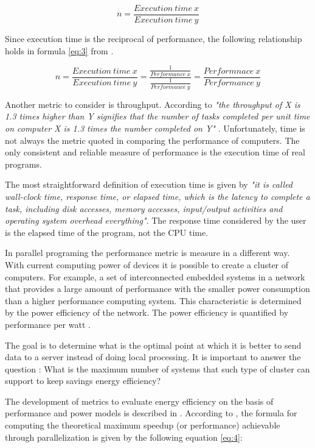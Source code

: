 \begin{equation}\label{eq:2}
n = \frac{Execution\ time\ x}{Execution\ time\ y}
\end{equation}

Since execution time is the reciprocal of performance, the following
relationship holds in formula \ref{eq:3} from \cite{Hennessy}.

\begin{equation}\label{eq:3}
n = \frac{Execution\ time\ x}{Execution\ time\ y} = \frac{\frac{1}{Performance\
x}}{\frac{1}{Performance\ y}} = \frac{Performnace\ x}{Performance\ y}
\end{equation}

Another metric to consider is throughput. According to \cite{Hennessy}
\textit{"the throughput of X is 1.3 times higher than Y signifies that the
number of tasks completed per unit time on computer X is 1.3 times the number
completed on Y"} . Unfortunately, time is not always the metric quoted in
comparing the performance of computers. The only consistent and reliable
measure of performance is the execution time of real programs. 

The most straightforward definition of execution time is given by
\cite{Hennessy} \textit{"it is called wall-clock time, response time, or elapsed
time, which is the latency to complete a task, including disk accesses, memory
accesses, input/output activities and operating system overhead everything"}.
The response time considered by the user is the elapsed time of the program, not the CPU
time.

In parallel programing the performance metric is measure in a different way.
With current computing power of devices it is possible to create a cluster of
computers. For example, a set of interconnected embedded systems in a network
that provides a large amount of performance with the smaller power consumption
than a higher performance computing system. This characteristic is determined
by the power efficiency of the network. The power efficiency is quantified by
performance per watt \cite{Jun}.

The goal is to determine what is the optimal point at which it is better to send
data to a server instead of doing local processing. It is important to answer
the question : What is the maximum number of systems that such type of cluster
can support to keep savings energy efficiency? 

The development of metrics to evaluate energy efficiency on the basis of
performance and power models is described in \cite{Dong}. According to
\cite{Dong}, the formula for computing the theoretical maximum speedup (or
performance) achievable through parallelization is given by the following
equation \ref{eq:4}:

